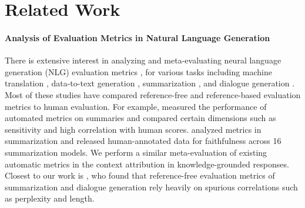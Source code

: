 \section{Related Work}

\paragraph{Analysis of Evaluation Metrics in Natural Language Generation}
There is extensive interest in analyzing and meta-evaluating neural language generation (NLG) evaluation metrics \cite{gehrmann2022repairing, gehrmann2021gem}, for various tasks including machine translation \cite{freitag2021experts, mathur-etal-2020-tangled}, data-to-text generation \cite{dhingra2019handling}, summarization \cite{bhandari-etal-2020-evaluating,pagnoni-etal-2021-understanding,durmus-etal-2020-feqa, gabriel-etal-2021-go, fabbri2021summeval, durmus-etal-2022-spurious}, and dialogue generation \cite{yeh-etal-2021-comprehensive, durmus-etal-2022-spurious}.  Most of these studies have compared reference-free and reference-based evaluation metrics to human evaluation. 
For example, 
\citet{gabriel-etal-2021-go} measured the performance of automated metrics on summaries and compared certain dimensions such as sensitivity and high correlation with human scores. \citet{fabbri2021summeval}  analyzed metrics in summarization and released human-annotated data for faithfulness across 16 summarization models. We perform a similar meta-evaluation of existing automatic metrics in the context attribution in knowledge-grounded responses. Closest to our work is \citet{durmus-etal-2022-spurious}, who found that reference-free evaluation metrics of summarization and dialogue generation rely heavily on spurious correlations such as perplexity and length. 


